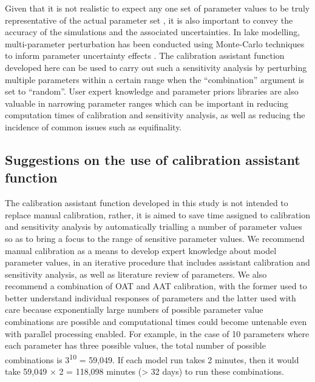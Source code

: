 Given that it is not realistic to expect any one set of parameter values to be truly representative of the actual parameter set \citep{beven1992future}, it is also important to convey the accuracy of the simulations and the associated uncertainties. In lake modelling, multi-parameter perturbation has been conducted using Monte-Carlo techniques to inform parameter uncertainty effects \citep{luo2018autocalibration,muraoka2019novel}. The calibration assistant function developed here can be used to carry out such a sensitivity analysis by perturbing multiple parameters within a certain range when the “combination” argument is set to “random”. User expert knowledge \citep{lehmann2018modelling} and parameter priors libraries \citep{robson2018towards} are also valuable in narrowing parameter ranges which can be important in reducing computation times of calibration and sensitivity analysis, as well as reducing the incidence of common issues such as equifinality.\par

\subsection{Suggestions on the use of calibration assistant function}

The calibration assistant function developed in this study is not intended to replace manual calibration, rather, it is aimed to save time assigned to calibration and sensitivity analysis by automatically trialling a number of parameter values so as to bring a focus to the range of sensitive parameter values. We recommend manual calibration as a means to develop expert knowledge about model parameter values, in an iterative procedure that includes assistant calibration and sensitivity analysis, as well as literature review of parameters. We also recommend a combination of OAT and AAT calibration, with the former used to better understand individual responses of parameters and the latter used with care because exponentially large numbers of possible parameter value combinations are possible and computational times could become untenable even with parallel processing enabled. For example, in the case of 10 parameters where each parameter has three possible values, the total number of possible combinations is 3\textsuperscript{10} = 59,049. If each model run takes 2 minutes, then it would take 59,049 × 2 = 118,098 minutes (> 32 days) to run these combinations.\par


